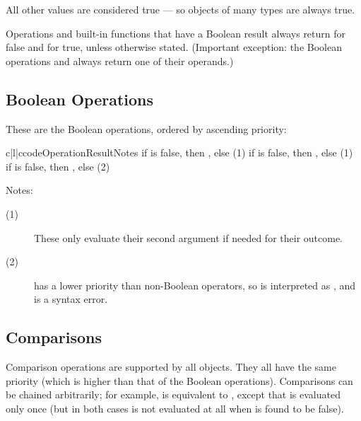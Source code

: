 All other values are considered true --- so objects of many types are
always true.

Operations and built-in functions that have a Boolean result always
return  for false and  for true, unless otherwise
stated.  (Important exception: the Boolean operations
 and  always return one of
their operands.)


\subsection{Boolean Operations \label{boolean}}

These are the Boolean operations, ordered by ascending priority:

\begin{tableiii}{c|l|c}{code}{Operation}{Result}{Notes}
          {if  is false, then , else }{(1)}
          {if  is false, then , else }{(1)}
  \hline
          {if  is false, then , else }{(2)}
\end{tableiii}

\noindent
Notes:

\begin{description}

\item[(1)]
These only evaluate their second argument if needed for their outcome.

\item[(2)]
 has a lower priority than non-Boolean operators, so
 is interpreted as , and  is a syntax error.

\end{description}


\subsection{Comparisons \label{comparisons}}

Comparison operations are supported by all objects.  They all have the
same priority (which is higher than that of the Boolean operations).
Comparisons can be chained arbitrarily; for example,  is equivalent to , except that  is evaluated only once (but
in both cases  is not evaluated at all when  is found to be false).

